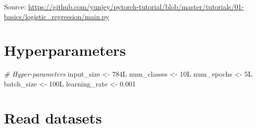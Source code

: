\documentclass[]{book}
\newenvironment{Shaded}{\begin{snugshade}}{\end{snugshade}}
\newcommand{\CommentTok}[1]{\textcolor[rgb]{0.56,0.35,0.01}{\textit{#1}}}
\newcommand{\FloatTok}[1]{\textcolor[rgb]{0.00,0.00,0.81}{#1}}
\newcommand{\KeywordTok}[1]{\textcolor[rgb]{0.13,0.29,0.53}{\textbf{#1}}}
\newcommand{\NormalTok}[1]{#1}
\newcommand{\OperatorTok}[1]{\textcolor[rgb]{0.81,0.36,0.00}{\textbf{#1}}}
\newcommand{\StringTok}[1]{\textcolor[rgb]{0.31,0.60,0.02}{#1}}
\begin{document}
Source: \url{https://github.com/yunjey/pytorch-tutorial/blob/master/tutorials/01-basics/logistic_regression/main.py}

\begin{Shaded}
\end{Shaded}

\hypertarget{hyperparameters}{%
\section{Hyperparameters}\label{hyperparameters}}

\begin{Shaded}
\begin{Highlighting}[]
\CommentTok{# Hyper-parameters }
\NormalTok{input_size    <-}\StringTok{ }\NormalTok{784L}
\NormalTok{num_classes   <-}\StringTok{ }\NormalTok{10L}
\NormalTok{num_epochs    <-}\StringTok{ }\NormalTok{5L}
\NormalTok{batch_size    <-}\StringTok{ }\NormalTok{100L}
\NormalTok{learning_rate <-}\StringTok{ }\FloatTok{0.001}
\end{Highlighting}
\end{Shaded}

\hypertarget{read-datasets}{%
\section{Read datasets}\label{read-datasets}}
\end{document}
